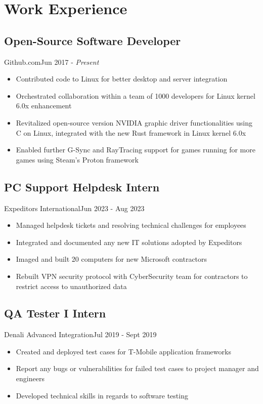 \section{Work Experience}
\subsection{Open-Source Software Developer}{Github.com}{Jun 2017 - \textit{Present}}
\begin{itemize}
  \item Contributed code to Linux for better desktop and server integration
  \item Orchestrated collaboration within a team of 1000 developers for Linux kernel 6.0x enhancement
  \item Revitalized open-source version NVIDIA graphic driver functionalities using C on Linux, integrated with the new Rust framework in Linux kernel 6.0x
  \item Enabled further G-Sync and RayTracing support for games running for more games using Steam's Proton framework
\end{itemize}
\subsection{PC Support Helpdesk Intern}{Expeditors International}{Jun 2023 - Aug 2023}
\begin{itemize}
    \item Managed helpdesk tickets and resolving technical challenges for employees
    \item Integrated and documented any new IT solutions adopted by Expeditors
    \item Imaged and built 20 computers for new Microsoft contractors
    \item Rebuilt VPN security protocol with CyberSecurity team for contractors to restrict access to unauthorized data
\end{itemize}
\subsection{QA Tester I Intern}{Denali Advanced Integration}{Jul 2019 - Sept 2019}
\begin{itemize}
   \item Created and deployed test cases for T-Mobile application frameworks
    \item Report any bugs or vulnerabilities for failed test cases to project manager and engineers  
    \item Developed technical skills in regards to software testing
\end{itemize}
